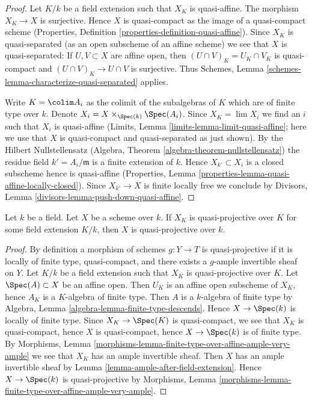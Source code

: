 \begin{proof}
Let $K/k$ be a field extension such that $X_K$ is quasi-affine.
The morphism $X_K \to X$ is surjective. Hence $X$ is quasi-compact
as the image of a quasi-compact scheme (Properties, Definition
\ref{properties-definition-quasi-affine}). Since $X_K$ is quasi-separated
(as an open subscheme of an affine scheme)
we see that $X$ is quasi-separated: If $U, V \subset X$ are
affine open, then $(U \cap V)_K = U_K \cap V_K$ is quasi-compact
and $(U \cap V)_K \to U \cap V$ is surjective. Thus
Schemes, Lemma \ref{schemes-lemma-characterize-quasi-separated} applies.

\medskip\noindent
Write $K = \colim A_i$ as the colimit of the subalgebras of $K$
which are of finite type over $k$. Denote
$X_i = X \times_{\Spec(k)} \Spec(A_i)$.
Since $X_K = \lim X_i$ we find an $i$ such that $X_i$ is quasi-affine
(Limits, Lemma \ref{limits-lemma-limit-quasi-affine};
here we use that $X$ is quasi-compact and quasi-separated as
just shown). By the Hilbert Nullstellensatz
(Algebra, Theorem \ref{algebra-theorem-nullstellensatz})
the residue field $k' = A_i/\mathfrak m$ is a finite
extension of $k$. Hence $X_{k'} \subset X_i$ is a closed
subscheme hence is quasi-affine (Properties, Lemma
\ref{properties-lemma-quasi-affine-locally-closed}).
Since $X_{k'} \to X$ is finite locally free we conclude by
Divisors, Lemma \ref{divisors-lemma-push-down-quasi-affine}.
\end{proof}

\begin{lemma}
\label{lemma-quasi-projective-after-field-extension}
Let $k$ be a field. Let $X$ be a scheme over $k$. If $X_K$ is quasi-projective
over $K$ for some field extension $K/k$, then $X$ is quasi-projective
over $k$.
\end{lemma}

\begin{proof}
By definition a morphism of schemes $g : Y \to T$ is quasi-projective
if it is locally of finite type, quasi-compact, and there exists
a $g$-ample invertible sheaf on $Y$.
Let $K/k$ be a field extension such that $X_K$ is quasi-projective
over $K$. Let $\Spec(A) \subset X$ be an affine open. Then $U_K$ is an
affine open subscheme of $X_K$, hence $A_K$ is a $K$-algebra of finite type.
Then $A$ is a $k$-algebra of finite type by
Algebra, Lemma \ref{algebra-lemma-finite-type-descends}.
Hence $X \to \Spec(k)$ is locally of finite type.
Since $X_K \to \Spec(K)$ is quasi-compact, we see that $X_K$ is
quasi-compact, hence $X$ is quasi-compact, hence $X \to \Spec(k)$
is of finite type. By Morphisms, Lemma
\ref{morphisms-lemma-finite-type-over-affine-ample-very-ample}
we see that $X_K$ has an ample invertible sheaf.
Then $X$ has an ample invertible sheaf by
Lemma \ref{lemma-ample-after-field-extension}.
Hence $X \to \Spec(k)$ is quasi-projective by Morphisms, Lemma
\ref{morphisms-lemma-finite-type-over-affine-ample-very-ample}.
\end{proof}

